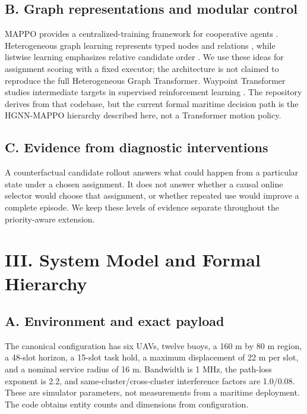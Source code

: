 \subsection*{B. Graph representations and modular control}

MAPPO provides a centralized-training framework for cooperative agents \cite{yu2022}. Heterogeneous graph learning represents typed nodes and relations \cite{hu2020}, while listwise learning emphasizes relative candidate order \cite{cao2007}. We use these ideas for assignment scoring with a fixed executor; the architecture is not claimed to reproduce the full Heterogeneous Graph Transformer. Waypoint Transformer studies intermediate targets in supervised reinforcement learning \cite{badrinath2023}. The repository derives from that codebase, but the current formal maritime decision path is the HGNN-MAPPO hierarchy described here, not a Transformer motion policy.

\subsection*{C. Evidence from diagnostic interventions}

A counterfactual candidate rollout answers what could happen from a particular state under a chosen assignment. It does not answer whether a causal online selector would choose that assignment, or whether repeated use would improve a complete episode. We keep these levels of evidence separate throughout the priority-aware extension.

\section*{III. System Model and Formal Hierarchy}

\subsection*{A. Environment and exact payload}

The canonical configuration has six UAVs, twelve buoys, a 160 m by 80 m region, a 48-slot horizon, a 15-slot task hold, a maximum displacement of 22 m per slot, and a nominal service radius of 16 m. Bandwidth is 1 MHz, the path-loss exponent is 2.2, and same-cluster/cross-cluster interference factors are 1.0/0.08. These are simulator parameters, not measurements from a maritime deployment. The code obtains entity counts and dimensions from configuration.

